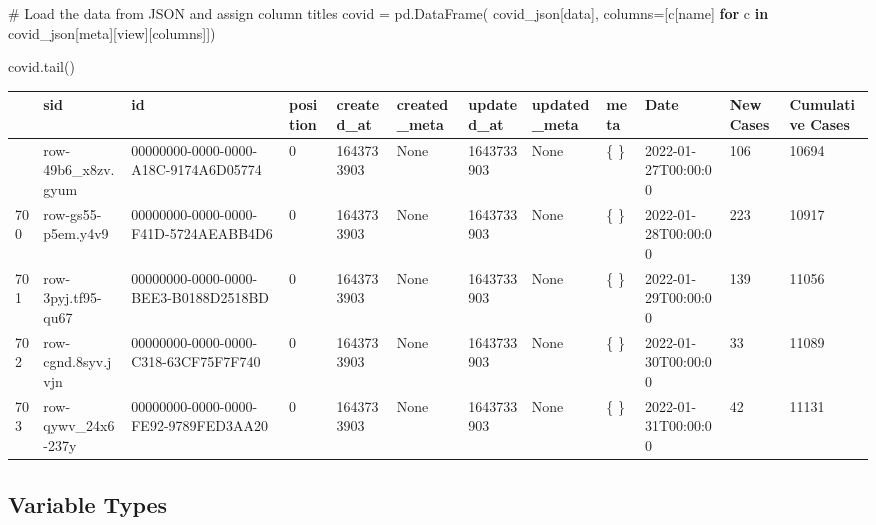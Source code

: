 \documentclass[
  letterpaper,
  DIV=11,
  numbers=noendperiod]{scrreprt}
\newenvironment{Shaded}{\begin{snugshade}}{\end{snugshade}}
\newcommand{\CommentTok}[1]{\textcolor[rgb]{0.37,0.37,0.37}{#1}}
\newcommand{\ControlFlowTok}[1]{\textcolor[rgb]{0.00,0.23,0.31}{\textbf{#1}}}
\newcommand{\KeywordTok}[1]{\textcolor[rgb]{0.00,0.23,0.31}{\textbf{#1}}}
\newcommand{\NormalTok}[1]{\textcolor[rgb]{0.00,0.23,0.31}{#1}}
\newcommand{\OperatorTok}[1]{\textcolor[rgb]{0.37,0.37,0.37}{#1}}
\newcommand{\StringTok}[1]{\textcolor[rgb]{0.13,0.47,0.30}{#1}}
\begin{document}
\begin{Shaded}
\begin{Highlighting}[]
\CommentTok{\# Load the data from JSON and assign column titles}
\NormalTok{covid }\OperatorTok{=}\NormalTok{ pd.DataFrame(}
\NormalTok{    covid\_json[}\StringTok{\textquotesingle{}data\textquotesingle{}}\NormalTok{],}
\NormalTok{    columns}\OperatorTok{=}\NormalTok{[c[}\StringTok{\textquotesingle{}name\textquotesingle{}}\NormalTok{] }\ControlFlowTok{for}\NormalTok{ c }\KeywordTok{in}\NormalTok{ covid\_json[}\StringTok{\textquotesingle{}meta\textquotesingle{}}\NormalTok{][}\StringTok{\textquotesingle{}view\textquotesingle{}}\NormalTok{][}\StringTok{\textquotesingle{}columns\textquotesingle{}}\NormalTok{]])}

\NormalTok{covid.tail()}
\end{Highlighting}
\end{Shaded}

\begin{longtable}[]{@{}llllllllllll@{}}
\toprule\noalign{}
& sid & id & position & created\_at & created\_meta & updated\_at &
updated\_meta & meta & Date & New Cases & Cumulative Cases \\
\midrule\noalign{}
\endhead
\bottomrule\noalign{}
\endlastfoot
699 & row-49b6\_x8zv.gyum & 00000000-0000-0000-A18C-9174A6D05774 & 0 &
1643733903 & None & 1643733903 & None & \{ \} & 2022-01-27T00:00:00 &
106 & 10694 \\
700 & row-gs55-p5em.y4v9 & 00000000-0000-0000-F41D-5724AEABB4D6 & 0 &
1643733903 & None & 1643733903 & None & \{ \} & 2022-01-28T00:00:00 &
223 & 10917 \\
701 & row-3pyj.tf95-qu67 & 00000000-0000-0000-BEE3-B0188D2518BD & 0 &
1643733903 & None & 1643733903 & None & \{ \} & 2022-01-29T00:00:00 &
139 & 11056 \\
702 & row-cgnd.8syv.jvjn & 00000000-0000-0000-C318-63CF75F7F740 & 0 &
1643733903 & None & 1643733903 & None & \{ \} & 2022-01-30T00:00:00 & 33
& 11089 \\
703 & row-qywv\_24x6-237y & 00000000-0000-0000-FE92-9789FED3AA20 & 0 &
1643733903 & None & 1643733903 & None & \{ \} & 2022-01-31T00:00:00 & 42
& 11131 \\
\end{longtable}

\subsection{Variable Types}\label{variable-types}
\end{document}
